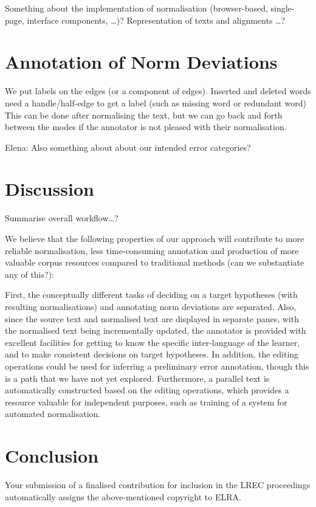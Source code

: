 \documentclass[10pt, a4paper]{article}
\begin{document}
Something about the implementation of normalisation (browser-based, single-page, interface components, \ldots )? Representation of texts and alignments \ldots ?

\section{Annotation of Norm Deviations}


%
We put labels on the edges (or a component of edges). Inserted and deleted words need a handle/half-edge to get
a label (such as missing word or redundant word)
This can be done after normalising the text, but we can go back and forth between the modes if the
annotator is not pleased with their normalisation.
%

Elena: Also something about about our intended error categories?

\section{Discussion}

Summarise overall workflow\ldots ?

We believe that the following properties of our approach will contribute to more reliable normalisation, less time-consuming annotation and production of more valuable corpus resources compared to traditional methods (can we substantiate any of this?):

First, the conceptually different tasks of deciding on a target hypotheses (with resulting normalisations) and annotating norm deviations are separated. Also, since the source text and normalised text are displayed in separate panes, with the normalised text being incrementally updated, the annotator is provided with excellent facilities for getting to know the specific inter-language of the learner, and to make consistent decisions on target hypotheses. In addition, the editing operations could be used for inferring a preliminary error annotation, though this is a path that we have not yet explored. Furthermore, a parallel text is automatically constructed based on the editing operations, which provides a resource valuable for independent purposes, such as training of a system for automated normalisation.

\section{Conclusion}

Your submission of a finalised contribution for inclusion in the LREC
proceedings automatically assigns the above-mentioned copyright to ELRA.
\end{document}
